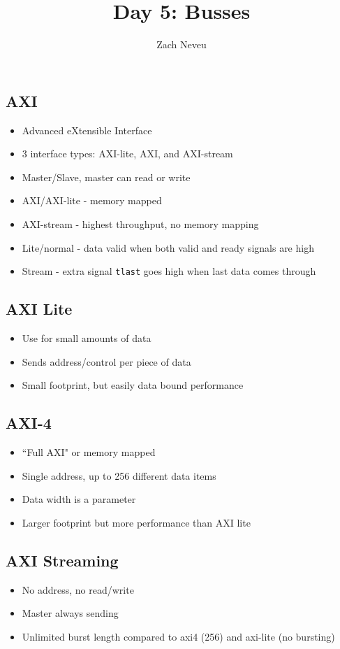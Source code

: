 \documentclass[12pt, letter]{article}
\author{Zach Neveu}
\title{ Day 5: Busses }
\begin{document}
\maketitle

\subsection*{AXI}
\begin{itemize}
	\item Advanced eXtensible Interface
	\item 3 interface types: AXI-lite, AXI, and AXI-stream
	\item Master/Slave, master can read or write
	\item AXI/AXI-lite - memory mapped
	\item AXI-stream - highest throughput, no memory mapping
	\item Lite/normal - data valid when both valid and ready signals are high
	\item Stream - extra signal \texttt{tlast} goes high when last data comes through
\end{itemize}

\subsection*{AXI Lite}
\begin{itemize}
	\item Use for small amounts of data
	\item Sends address/control per piece of data
	\item Small footprint, but easily data bound performance
\end{itemize}

\subsection*{AXI-4}
\begin{itemize}
	\item ``Full AXI" or memory mapped
	\item Single address, up to 256 different data items
	\item Data width is a parameter
	\item Larger footprint but more performance than AXI lite
\end{itemize}

\subsection*{AXI Streaming}
\begin{itemize}
	\item No address, no read/write
	\item Master always sending
	\item Unlimited burst length compared to axi4 (256) and axi-lite (no bursting)
\end{itemize}
\end{document}
